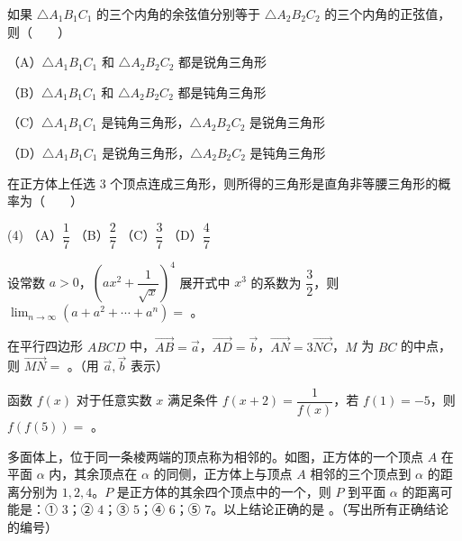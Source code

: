 \begin{question}
如果 $\triangle A_1B_1C_1$ 的三个内角的余弦值分别等于 $\triangle A_2B_2C_2$ 的三个内角的正弦值，则\mbox{（　　）}

（A）$\triangle A_1B_1C_1$ 和 $\triangle A_2B_2C_2$ 都是锐角三角形

（B）$\triangle A_1B_1C_1$ 和 $\triangle A_2B_2C_2$ 都是钝角三角形

（C）$\triangle A_1B_1C_1$ 是钝角三角形，$\triangle A_2B_2C_2$ 是锐角三角形

（D）$\triangle A_1B_1C_1$ 是锐角三角形，$\triangle A_2B_2C_2$ 是钝角三角形

\end{question}
\begin{question}
在正方体上任选 3 个顶点连成三角形，则所得的三角形是直角非等腰三角形的概率为\mbox{（　　）}

\begin{gkopts}(4)
\task （A）$\dfrac17$
\task （B）$\dfrac27$
\task （C）$\dfrac37$
\task （D）$\dfrac47$
\end{gkopts}

\end{question}

\begin{question}
设常数 $a>0$，$(ax^2+\dfrac{1}{\sqrt{x}})^4$ 展开式中 $x^3$ 的系数为 $\dfrac32$，则 $\displaystyle\lim_{n\to\infty}(a+a^2+\cdots+a^n)=$ \gkblank{}。

\end{question}
\begin{question}
在平行四边形 $ABCD$ 中，$\overrightarrow{AB}=\vec a$，$\overrightarrow{AD}=\vec b$，$\overrightarrow{AN}=3\overrightarrow{NC}$，$M$ 为 $BC$ 的中点，则 $\overrightarrow{MN}=$ \gkblank{}。（用 $\vec a,\vec b$ 表示）

\end{question}
\begin{question}
函数 $f(x)$ 对于任意实数 $x$ 满足条件 $f(x+2)=\dfrac{1}{f(x)}$，若 $f(1)=-5$，则 $f(f(5))=$ \gkblank{}。

\Needspace{0.4\textheight}
\end{question}
\begin{question}
多面体上，位于同一条棱两端的顶点称为相邻的。如图，正方体的一个顶点 $A$ 在平面 $\alpha$ 内，其余顶点在 $\alpha$ 的同侧，正方体上与顶点 $A$ 相邻的三个顶点到 $\alpha$ 的距离分别为 $1,2,4$。$P$ 是正方体的其余四个顶点中的一个，则 $P$ 到平面 $\alpha$ 的距离可能是：① $3$；② $4$；③ $5$；④ $6$；⑤ $7$。以上结论正确的是 \gkblank{}。（写出所有正确结论的编号）
\nopagebreak[4]
\begin{center}\end{center}
\nopagebreak[4]
\end{question}


